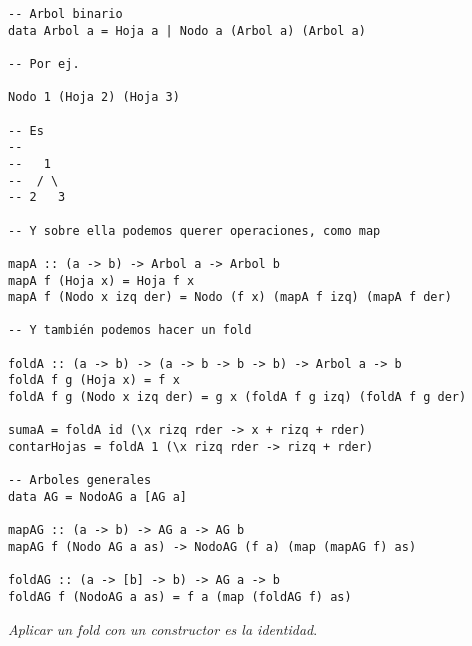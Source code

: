 \documentclass{report}
\theoremstyle{definition} %
\begin{document}
\begin{verbatim}
-- Arbol binario
data Arbol a = Hoja a | Nodo a (Arbol a) (Arbol a)

-- Por ej.

Nodo 1 (Hoja 2) (Hoja 3)

-- Es
--
--   1
--  / \
-- 2   3

-- Y sobre ella podemos querer operaciones, como map

mapA :: (a -> b) -> Arbol a -> Arbol b
mapA f (Hoja x) = Hoja f x
mapA f (Nodo x izq der) = Nodo (f x) (mapA f izq) (mapA f der)

-- Y también podemos hacer un fold

foldA :: (a -> b) -> (a -> b -> b -> b) -> Arbol a -> b
foldA f g (Hoja x) = f x
foldA f g (Nodo x izq der) = g x (foldA f g izq) (foldA f g der)

sumaA = foldA id (\x rizq rder -> x + rizq + rder)
contarHojas = foldA 1 (\x rizq rder -> rizq + rder)

-- Arboles generales
data AG = NodoAG a [AG a]

mapAG :: (a -> b) -> AG a -> AG b
mapAG f (Nodo AG a as) -> NodoAG (f a) (map (mapAG f) as)

foldAG :: (a -> [b] -> b) -> AG a -> b
foldAG f (NodoAG a as) = f a (map (foldAG f) as)
\end{verbatim}

\textit{Aplicar un fold con un constructor es la identidad}.
\end{document}
